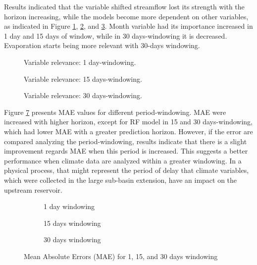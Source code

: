 \documentclass[12pt]{article}
\begin{document}
Results indicated that the variable shifted streamflow lost its strength with the horizon increasing, while the models become more dependent on other variables, as indicated in Figure \ref{fig:sfig1_relevance}, \ref{fig:sfig2_relevance}, and \ref{fig:sfig3_relevance}. Month variable had its importance increased in 1 day and 15 days of window, while in 30 days-windowing it is decreased. Evaporation starts being more relevant with 30-days windowing.

\begin{figure}[htbp]
    \centering
    
    \caption{Variable relevance: 1 day-windowing.}
    \label{fig:sfig1_relevance}
\end{figure}
\begin{figure}[htbp]
    \centering
    
    \caption{Variable relevance: 15 days-windowing.}
    \label{fig:sfig2_relevance}
\end{figure}
\begin{figure}[htbp]
    \centering
    
    \caption{Variable relevance: 30 days-windowing.}
    \label{fig:sfig3_relevance}
\end{figure}

Figure \ref{fig:sfigMAE} presents MAE values for different period-windowing. MAE were increased with  higher horizon, except for RF model in 15 and 30 days-windowing, which had lower MAE with a greater prediction horizon. However, if the error are compared analyzing the period-windowing, results indicate that there is a slight improvement regards MAE when this period is increased. This suggests a better performance when climate data are analyzed within a greater windowing. In a physical process, that might represent the period of delay that climate variables, which were collected in the large sub-basin extension, have an impact on the upstream reservoir.


\begin{figure}[htbp]
    \centering
    \begin{subfigure}[b]{.49\textwidth}
        \centering
        
        \caption{1 day windowing}
        \label{fig:sfig1MAE}
    \end{subfigure}
    \begin{subfigure}[b]{.49\textwidth}
        \centering
        
        \caption{15 days windowing}
        \label{fig:sfig2MAE}
    \end{subfigure}
    \begin{subfigure}[b]{\textwidth}
        \centering
        
        \captionsetup{justification=justified,singlelinecheck=false}
        \caption{30 days windowing}
        \label{fig:sfig3MAE}
    \end{subfigure}
    \caption{Mean Absolute Errors (MAE) for  1,  15, and  30 days windowing}
    \label{fig:sfigMAE}
\end{figure}
\end{document}
